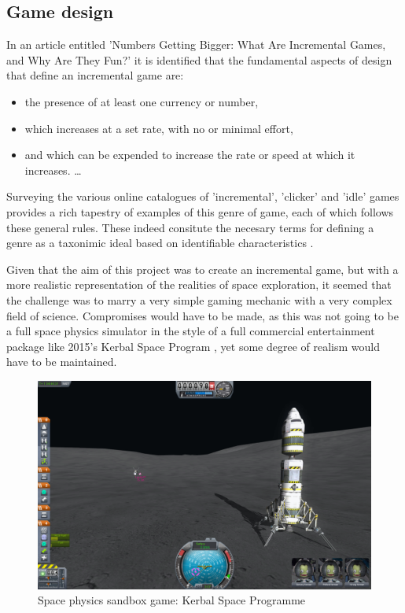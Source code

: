 \documentclass[twoside]{bhamthesis}
\begin{document}
\subsection{Game design}

In an article entitled 'Numbers Getting Bigger: What Are Incremental Games, and Why Are They Fun?' \cite{king_numbers_2015} it is identified that the fundamental aspects of design that define an incremental game are:
\begin{itemize}
\item the presence of at least one currency or number, 
\item which increases at a set rate, with no or minimal effort, 
\item and which can be expended to increase the rate or speed at which it increases. \ldots
\end{itemize}
 
Surveying the various online catalogues of 'incremental', 'clicker' and 'idle' games provides a rich tapestry of examples of this genre of game, each of which follows these general rules. These indeed consitute the necesary terms for defining a genre as a taxonimic ideal based on identifiable characteristics \cite{clarke_why_2017}.

Given that the aim of this project was to create an incremental game, but with a more realistic representation of the realities of space exploration, it seemed that the challenge was to marry a very simple gaming mechanic with a very complex field of science. Compromises would have to be made, as this was not going to be a full space physics simulator in the style of a full commercial entertainment package like 2015's Kerbal Space Program \cite{squad_kerbal_2015}, yet some degree of realism would have to be maintained.

\begin{figure}[h!]
  \includegraphics[width=\linewidth]{images/ksp.png}
  \caption{Space physics sandbox game: Kerbal Space Programme {\cite{tang_kerbal_2014}}}
  \label{fig:ksp}
\end{figure} 
\end{document}
